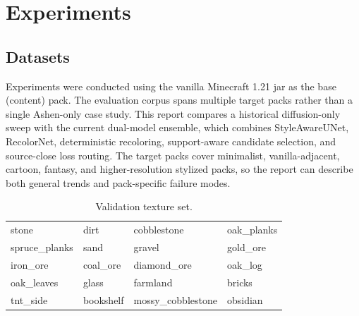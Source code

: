 \chapter{Experiments}
\label{chap:experiments}

\section{Datasets}

Experiments were conducted using the vanilla Minecraft 1.21 jar as the base
(content) pack. The evaluation corpus spans multiple target packs rather than
a single Ashen-only case study. This report compares a historical
diffusion-only sweep with the current dual-model ensemble, which combines
StyleAwareUNet, RecolorNet, deterministic recoloring, support-aware candidate
selection, and source-close loss routing. The target packs cover minimalist,
vanilla-adjacent, cartoon, fantasy, and higher-resolution stylized packs, so
the report can describe both general trends and pack-specific failure modes.

\begin{table}[htbp]
    \centering
    \caption{Validation texture set.}
    \label{tab:validation-textures}
    \begin{tabular}{@{}llll@{}}
        \toprule
        stone & dirt & cobblestone & oak\_planks \\
        spruce\_planks & sand & gravel & gold\_ore \\
        iron\_ore & coal\_ore & diamond\_ore & oak\_log \\
        oak\_leaves & glass & farmland & bricks \\
        tnt\_side & bookshelf & mossy\_cobblestone & obsidian \\
        \bottomrule
    \end{tabular}
\end{table}

